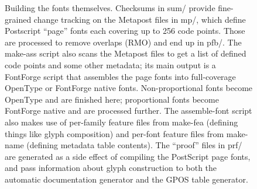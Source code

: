 \documentclass[14pt]{extarticle}
\begin{document}
\begin{figure}
\caption{Building the fonts themselves.  Checksums in sum/ provide
fine-grained change tracking on the Metapost files in mp/, which define
Postscript ``page'' fonts each covering up to 256 code points.  Those are
processed to remove overlaps (RMO) and end up in pfb/.  The make-ass script
also scans the Metapost files to get a list of defined code points and some
other metadata; its main output is a FontForge
script that assembles the page fonts into full-coverage OpenType or
FontForge native fonts.  Non-proportional fonts become OpenType and are
finished here; proportional fonts become FontForge native and are processed
further.  The assemble-font script also makes use of per-family feature
files from make-fea (defining things like glyph composition) and per-font
feature files from make-name (defining metadata table contents).  The
``proof'' files in prf/ are generated as a side effect of compiling the
PostScript page fonts, and pass information about glyph construction to
both the automatic documentation generator and the GPOS table generator.}
\label{fig:build-fonts}
\end{figure}
\end{document}
